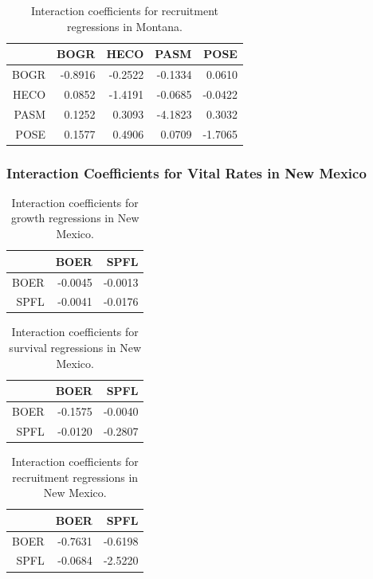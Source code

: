 \documentclass[12pt,]{article}
\begin{document}
\begin{table}[ht]
\centering
\caption{Interaction coefficients for recruitment regressions in Montana.} 
\begin{tabular}{rrrrr}
  \hline
 & BOGR & HECO & PASM & POSE \\ 
  \hline
BOGR & -0.8916 & -0.2522 & -0.1334 & 0.0610 \\ 
  HECO & 0.0852 & -1.4191 & -0.0685 & -0.0422 \\ 
  PASM & 0.1252 & 0.3093 & -4.1823 & 0.3032 \\ 
  POSE & 0.1577 & 0.4906 & 0.0709 & -1.7065 \\ 
   \hline
\end{tabular}
\end{table}



\newpage{}

\subsubsection{Interaction Coefficients for Vital Rates in New Mexico}

\begin{table}[ht]
\centering
\caption{Interaction coefficients for growth regressions in New Mexico.} 
\begin{tabular}{rrr}
  \hline
 & BOER & SPFL \\ 
  \hline
BOER & -0.0045 & -0.0013 \\ 
  SPFL & -0.0041 & -0.0176 \\ 
   \hline
\end{tabular}
\end{table}

\begin{table}[ht]
\centering
\caption{Interaction coefficients for survival regressions in New Mexico.} 
\begin{tabular}{rrr}
  \hline
 & BOER & SPFL \\ 
  \hline
BOER & -0.1575 & -0.0040 \\ 
  SPFL & -0.0120 & -0.2807 \\ 
   \hline
\end{tabular}
\end{table}

\begin{table}[ht]
\centering
\caption{Interaction coefficients for recruitment regressions in New Mexico.} 
\begin{tabular}{rrr}
  \hline
 & BOER & SPFL \\ 
  \hline
BOER & -0.7631 & -0.6198 \\ 
  SPFL & -0.0684 & -2.5220 \\ 
   \hline
\end{tabular}
\end{table}
\end{document}
